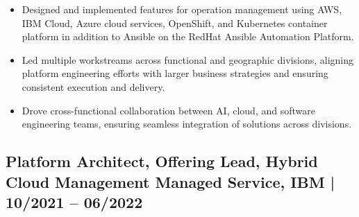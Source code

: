 \documentclass[12pt,parskip=half]{scrartcl}
\begin{document}
\begin{itemize}
\item Designed and implemented features for operation management using AWS, IBM Cloud, Azure cloud services, OpenShift, and Kubernetes container platform in addition to Ansible on the RedHat Ansible Automation Platform.

    \item Led multiple workstreams across functional and geographic divisions, aligning platform engineering efforts with larger business strategies and ensuring consistent execution and delivery.
\item Drove cross-functional collaboration between AI, cloud, and software engineering teams, ensuring seamless integration of solutions across divisions.
\end{itemize}

\subsection*{Platform Architect, Offering Lead, Hybrid Cloud Management Managed Service, IBM | 10/2021 -- 06/2022}
\end{document}
